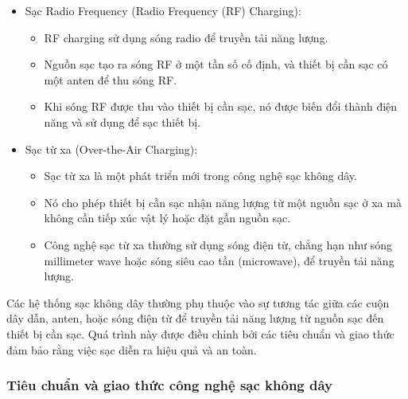 \documentclass{article} %
\begin{document}
\begin{itemize}
\begin{itemize}
        \end{itemize}
    \item Sạc Radio Frequency (Radio Frequency (RF) Charging):
        \begin{itemize}
            \item RF charging sử dụng sóng radio để truyền tải năng lượng.
            \item Nguồn sạc tạo ra sóng RF ở một tần số cố định, và thiết bị cần sạc có một anten để thu sóng RF.
            \item Khi sóng RF được thu vào thiết bị cần sạc, nó được biến đổi thành điện năng và sử dụng để sạc thiết bị.
        \end{itemize}
    \item Sạc từ xa (Over-the-Air Charging):
        \begin{itemize}
            \item Sạc từ xa là một phát triển mới trong công nghệ sạc không dây.
            \item Nó cho phép thiết bị cần sạc nhận năng lượng từ một nguồn sạc ở xa mà không cần tiếp xúc vật lý hoặc đặt gần nguồn sạc.
            \item Công nghệ sạc từ xa thường sử dụng sóng điện từ, chẳng hạn như sóng millimeter wave hoặc sóng siêu cao tần (microwave), để truyền tải năng lượng.
        \end{itemize}
\end{itemize}

Các hệ thống sạc không dây thường phụ thuộc vào sự tương tác giữa các cuộn dây dẫn, anten, hoặc sóng điện từ để truyền tải năng lượng từ nguồn sạc đến thiết bị cần sạc. Quá trình này được điều chỉnh bởi các tiêu chuẩn và giao thức đảm bảo rằng việc sạc diễn ra hiệu quả và an toàn.

\subsubsection{Tiêu chuẩn và giao thức công nghệ sạc không dây}
\end{document}
